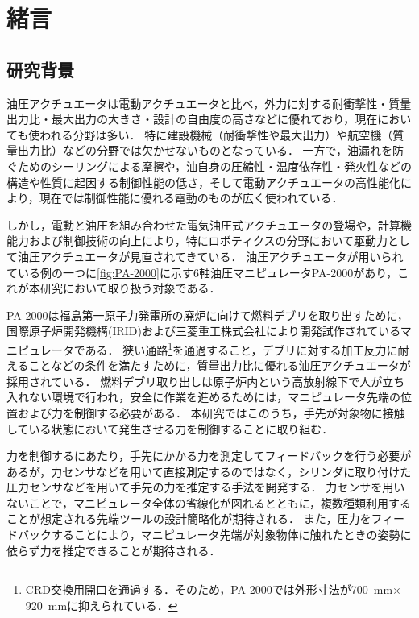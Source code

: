 \chapter{緒言}

\section{研究背景}
油圧アクチュエータは電動アクチュエータと比べ，外力に対する耐衝撃性・質量出力比・最大出力の大きさ・設計の自由度の高さなどに優れており，現在においても使われる分野は多い．
特に建設機械（耐衝撃性や最大出力）や航空機（質量出力比）などの分野では欠かせないものとなっている．
一方で，油漏れを防ぐためのシーリングによる摩擦や，油自身の圧縮性・温度依存性・発火性などの構造や性質に起因する制御性能の低さ，そして電動アクチュエータの高性能化により，現在では制御性能に優れる電動のものが広く使われている．

しかし，電動と油圧を組み合わせた電気油圧式アクチュエータの登場や，計算機能力および制御技術の向上により，特にロボティクスの分野において駆動力として油圧アクチュエータが見直されてきている\cite{feng2014optimization,kuindersma2016optimization,玄相昊2015招待講演}．
油圧アクチュエータが用いられている例の一つに\figname\ref{fig:PA-2000}に示す6軸油圧マニピュレータPA-2000\cite{IRID}があり，これが本研究において取り扱う対象である．

PA-2000は福島第一原子力発電所の廃炉に向けて燃料デブリを取り出すために，国際原子炉開発機構(IRID)および三菱重工株式会社により開発試作されているマニピュレータである\cite{河西賢一2018福島第一原子力発電所燃料デブリ横取り出しに向けたロボット開発}．
狭い通路\footnote{CRD交換用開口を通過する．そのため，PA-2000では外形寸法が\SI{700}{mm}$\times$\SI{920}{mm}に抑えられている．}を通過すること，デブリに対する加工反力に耐えることなどの条件を満たすために，質量出力比に優れる油圧アクチュエータが採用されている．
燃料デブリ取り出しは原子炉内という高放射線下で人が立ち入れない環境で行われ，安全に作業を進めるためには，マニピュレータ先端の位置および力を制御する必要がある．
本研究ではこのうち，手先が対象物に接触している状態において発生させる力を制御することに取り組む．

力を制御するにあたり，手先にかかる力を測定してフィードバックを行う必要があるが，力センサなどを用いて直接測定するのではなく，シリンダに取り付けた圧力センサなどを用いて手先の力を推定する手法を開発する．
力センサを用いないことで，マニピュレータ全体の省線化が図れるとともに，複数種類利用することが想定される先端ツールの設計簡略化が期待される．
また，圧力をフィードバックすることにより，マニピュレータ先端が対象物体に触れたときの姿勢に依らず力を推定できることが期待される．

